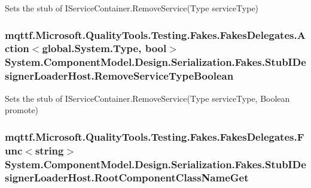 Sets the stub of I\-Service\-Container.\-Remove\-Service(\-Type service\-Type)

\hypertarget{class_system_1_1_component_model_1_1_design_1_1_serialization_1_1_fakes_1_1_stub_i_designer_loader_host_a61f005908febdf1ab7e712ae102309a1}{
\subsubsection[{Remove\-Service\-Type\-Boolean}]{\setlength{\rightskip}{0pt plus 5cm}mqttf.\-Microsoft.\-Quality\-Tools.\-Testing.\-Fakes.\-Fakes\-Delegates.\-Action$<$global.\-System.\-Type, bool$>$ System.\-Component\-Model.\-Design.\-Serialization.\-Fakes.\-Stub\-I\-Designer\-Loader\-Host.\-Remove\-Service\-Type\-Boolean}}\label{class_system_1_1_component_model_1_1_design_1_1_serialization_1_1_fakes_1_1_stub_i_designer_loader_host_a61f005908febdf1ab7e712ae102309a1}


Sets the stub of I\-Service\-Container.\-Remove\-Service(\-Type service\-Type, Boolean promote)

\hypertarget{class_system_1_1_component_model_1_1_design_1_1_serialization_1_1_fakes_1_1_stub_i_designer_loader_host_aad24ef95c6256fef9900836884c35a8c}{
\subsubsection[{Root\-Component\-Class\-Name\-Get}]{\setlength{\rightskip}{0pt plus 5cm}mqttf.\-Microsoft.\-Quality\-Tools.\-Testing.\-Fakes.\-Fakes\-Delegates.\-Func$<$string$>$ System.\-Component\-Model.\-Design.\-Serialization.\-Fakes.\-Stub\-I\-Designer\-Loader\-Host.\-Root\-Component\-Class\-Name\-Get}}\label{class_system_1_1_component_model_1_1_design_1_1_serialization_1_1_fakes_1_1_stub_i_designer_loader_host_aad24ef95c6256fef9900836884c35a8c}


